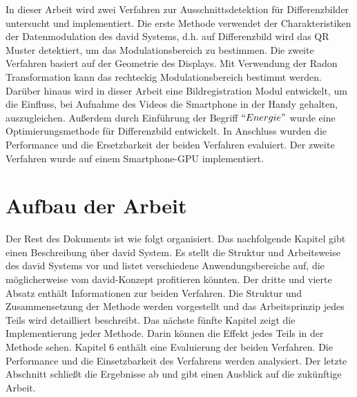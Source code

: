 In dieser Arbeit wird zwei Verfahren zur Ausschnittsdetektion für Differenzbilder untersucht und implementiert. Die erste Methode verwendet der Charakteristiken der Datenmodulation des \gls{david} Systems, d.h. auf Differenzbild wird das QR Muster detektiert, um das Modulationsbereich zu bestimmen. Die zweite Verfahren basiert auf der Geometrie des Displays. Mit Verwendung der Radon Transformation kann das rechteckig Modulationsbereich bestimmt werden. Darüber hinaus wird in dieser Arbeit eine Bildregistration Modul entwickelt, um die Einfluss, bei Aufnahme des Videos die Smartphone in der Handy gehalten, auszugleichen. Außerdem durch Einführung der Begriff $ ``Energie" $ wurde eine Optimierungsmethode für Differenzbild entwickelt. In Anschluss wurden die Performance und die Ersetzbarkeit der beiden Verfahren evaluiert. Der zweite Verfahren wurde auf einem Smartphone-GPU implementiert.

\section{Aufbau der Arbeit} 

Der Rest des Dokuments ist wie folgt organisiert. Das nachfolgende Kapitel gibt einen Beschreibung über \gls{david} System. Es stellt die Struktur und Arbeitsweise des \gls{david} Systems vor und listet verschiedene Anwendungsbereiche auf, die möglicherweise vom \gls{david}-Konzept profitieren könnten. Der dritte und vierte Absatz enthält Informationen zur beiden Verfahren. Die Struktur und Zusammensetzung der Methode werden vorgestellt und das Arbeitsprinzip jedes Teils wird detailliert beschreibt. Das nächste fünfte Kapitel zeigt die Implementierung jeder Methode. Darin können die Effekt jedes Teils in der Methode sehen. %
Kapitel 6 enthält eine Evaluierung der beiden Verfahren. Die Performance und die Einsetzbarkeit des Verfahrens werden analysiert. Der letzte Abschnitt schließt die Ergebnisse ab und gibt einen Ausblick auf die zukünftige Arbeit.